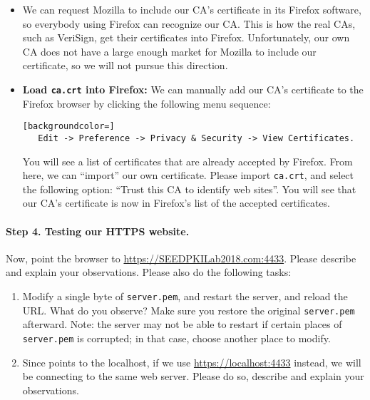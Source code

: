 \begin{itemize}

\item We can request Mozilla to include our CA's certificate in its Firefox software, so
everybody using Firefox can recognize our CA.  This is how the real CAs, such as VeriSign, get
their certificates into Firefox. Unfortunately, our own CA does not have a large enough market
for Mozilla to include our certificate, so we will not pursue this direction.

\item {\bf Load {\tt ca.crt} into Firefox:} We can manually add our CA's certificate to the
Firefox browser by clicking the following menu sequence:

\begin{lstlisting}[backgroundcolor=]
   Edit -> Preference -> Privacy & Security -> View Certificates.
\end{lstlisting}

You will see a list of certificates that are already accepted by Firefox. From here, we 
can ``import'' our own certificate. Please import {\tt ca.crt}, and select the
following option: ``Trust this CA to identify web sites''.  You will see that 
our CA's certificate is now in Firefox's list of the accepted certificates.
\end{itemize}


\paragraph{Step 4. Testing our HTTPS website.}
Now, point the browser to \url{https://SEEDPKILab2018.com:4433}. Please 
describe and explain your observations. Please also do the following
tasks:

\begin{enumerate}
\item Modify a single byte of {\tt server.pem}, and restart the 
      server, and reload the URL. 
      What do you observe? Make sure you restore the 
      original {\tt server.pem} afterward. Note:
      the server may not be able to restart if certain places of
      {\tt server.pem} is corrupted; in that case, choose 
      another place to modify.
      

\item Since \pkiserver points to the localhost, if we
      use \url{https://localhost:4433} instead, we will be connecting to the 
      same web server. Please do so, describe and explain your observations. 
\end{enumerate}



